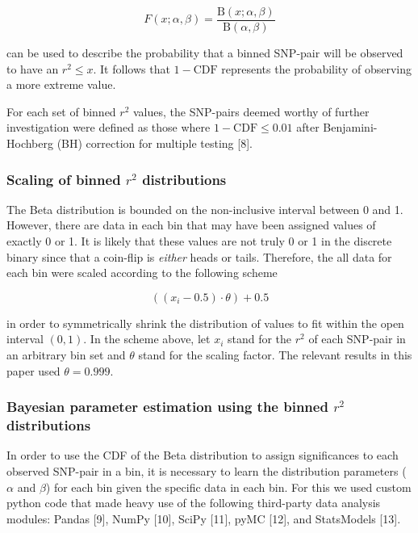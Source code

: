 \documentclass[letterpaper]{scrartcl}
\begin{document}
\[F(x;\alpha,\beta) = \frac{\mathrm{B}(x;\alpha,\beta)}{\mathrm{B}(\alpha,\beta)} \]

can be used to describe the probability that a binned SNP-pair will be
observed to have an \(r^2 \le x\). It follows that \(1-\mathrm{CDF}\)
represents the probability of observing a more extreme value.

For each set of binned \(r^2\) values, the SNP-pairs deemed worthy of
further investigation were defined as those where
\(1-\mathrm{CDF} \le 0.01\) after Benjamini-Hochberg (BH) correction for
multiple testing {[}8{]}.

\subsubsection{Scaling of binned \(r^2\)
distributions}\label{scaling-of-binned-r2-distributions}

The Beta distribution is bounded on the non-inclusive interval between 0
and 1. However, there are data in each bin that may have been assigned
values of exactly 0 or 1. It is likely that these values are not truly 0
or 1 in the discrete binary since that a coin-flip is \emph{either}
heads or tails. Therefore, the all data for each bin were scaled
according to the following scheme

\[((x_i - 0.5)\cdot \theta) + 0.5\]

in order to symmetrically shrink the distribution of values to fit
within the open interval \((0,1)\). In the scheme above, let \(x_i\)
stand for the \(r^2\) of each SNP-pair in an arbitrary bin set and
\(\theta\) stand for the scaling factor. The relevant results in this
paper used \(\theta = 0.999\).

\subsubsection{Bayesian parameter estimation using the binned \(r^2\)
distributions}\label{bayesian-parameter-estimation-using-the-binned-r2-distributions}

In order to use the CDF of the Beta distribution to assign significances
to each observed SNP-pair in a bin, it is necessary to learn the
distribution parameters (\(\alpha\) and \(\beta\)) for each bin given
the specific data in each bin. For this we used custom python code that
made heavy use of the following third-party data analysis modules:
Pandas {[}9{]}, NumPy {[}10{]}, SciPy {[}11{]}, pyMC {[}12{]}, and
StatsModels {[}13{]}.
\end{document}
